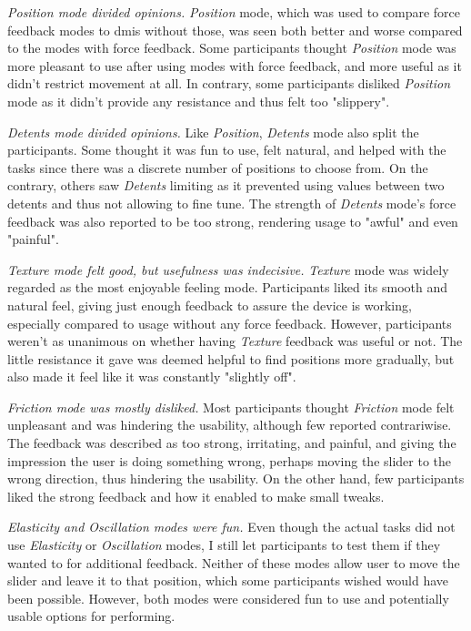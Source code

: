 \textit{Position mode divided opinions.} \textit{Position} mode, which was used to compare force feedback modes to \glspl{dmi} without those, was seen both better and worse compared to the modes with force feedback. Some participants thought \textit{Position} mode was more pleasant to use after using modes with force feedback, and more useful as it didn't restrict movement at all. In contrary, some participants disliked \textit{Position} mode as it didn't provide any resistance and thus felt too "slippery".

\textit{Detents mode divided opinions.} Like \textit{Position}, \textit{Detents} mode also split the participants. Some thought it was fun to use, felt natural, and helped with the tasks since there was a discrete number of positions to choose from. On the contrary, others saw \textit{Detents} limiting as it prevented using values between two detents and thus not allowing to fine tune. The strength of \textit{Detents} mode's force feedback was also reported to be too strong, rendering usage to "awful" and even "painful".

\textit{Texture mode felt good, but usefulness was indecisive.} \textit{Texture} mode was widely regarded as the most enjoyable feeling mode. Participants liked its smooth and natural feel, giving just enough feedback to assure the device is working, especially compared to usage without any force feedback. However, participants weren't as unanimous on whether having \textit{Texture} feedback was useful or not. The little resistance it gave was deemed helpful to find positions more gradually, but also made it feel like it was constantly "slightly off".

\textit{Friction mode was mostly disliked.} Most participants thought \textit{Friction} mode felt unpleasant and was hindering the usability, although few reported contrariwise. The feedback was described as too strong, irritating, and painful, and giving the impression the user is doing something wrong, perhaps moving the slider to the wrong direction, thus hindering the usability. On the other hand, few participants liked the strong feedback and how it enabled to make small tweaks.

\textit{Elasticity and Oscillation modes were fun.} Even though the actual tasks did not use \textit{Elasticity} or \textit{Oscillation} modes, I still let participants to test them if they wanted to for additional feedback. Neither of these modes allow user to move the slider and leave it to that position, which some participants wished would have been possible. However, both modes were considered fun to use and potentially usable options for performing.

